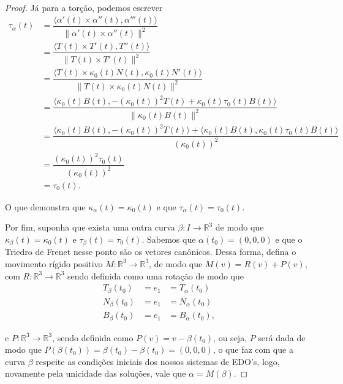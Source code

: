 \documentclass[11pt,letterpaper,twocolumn]{article}
\begin{document}
\begin{proof}
    Já para a torção, podemos escrever 
    \begin{equation*}
        \begin{split}
            \tau_\alpha(t) & = \dfrac{\langle \alpha'(t)\times \alpha''(t), \alpha'''(t)\rangle}{\|\alpha'(t)\times \alpha''(t)\|^2} \\
            & = \dfrac{\langle T(t)\times T'(t), T''(t)\rangle}{\|T(t)\times T'(t)\|^2} \\
            & = \dfrac{\langle T(t)\times \kappa_0(t)N(t), \kappa_0(t)N'(t)\rangle}{\|T(t)\times \kappa_0(t)N(t)\|^2} \\
            & = \dfrac{\langle \kappa_0(t)B(t), -(\kappa_0(t))^2T(t) + \kappa_0(t)\tau_0(t)B(t)\rangle}{\|\kappa_0(t)B(t)\|^2} \\
            & = \dfrac{\langle \kappa_0(t)B(t), -\left(\kappa_0(t)\right)^2T(t)\rangle + \langle \kappa_0(t)B(t), \kappa_0(t)\tau_0(t)B(t)\rangle}{\left(\kappa_0(t)\right)^2} \\
            & = \dfrac{\left(\kappa_0(t)\right)^2\tau_0(t)}{\left(\kappa_0(t)\right)^2} \\
            & = \tau_0(t).
        \end{split}
    \end{equation*}
    
    O que demonstra que $\kappa_\alpha(t) = \kappa_0(t)$ e que $\tau_\alpha(t) = \tau_0(t)$.
    
    Por fim, suponha que exista uma outra curva $\beta : I\to \mathbb{R}^3$ de modo que $\kappa_\beta(t) = \kappa_0(t)$ e $\tau_\beta(t) = \tau_0(t)$. Sabemos que $\alpha(t_0) = (0, 0, 0)$ e que o Triedro de Frenet nesse ponto são os vetores canônicos. Dessa forma, defina o movimento rígido positivo $M : \mathbb{R}^3\to \mathbb{R}^3$, de modo que $M(v) = R(v) + P(v)$, com $R : \mathbb{R}^3\to \mathbb{R}^3$ sendo definida como uma rotação de modo que
    \begin{equation*}
        \begin{split}
            T_\beta(t_0) & = e_1 & = T_\alpha(t_0) \\
            N_\beta(t_0) & = e_1 & = N_\alpha(t_0) \\
            B_\beta(t_0) & = e_1 & = B_\alpha(t_0),
        \end{split}
    \end{equation*}
    
    \noindent e $P : \mathbb{R}^3\to \mathbb{R}^3$, sendo definida como $P(v) = v - \beta(t_0)$, ou seja, $P$ será dada de modo que $P(\beta(t_0)) = \beta(t_0) - \beta(t_0) = (0, 0, 0)$, o que faz com que a curva $\beta$ respeite as condições iniciais dos nossos sistemas de EDO's, logo, novamente pela unicidade das soluções, vale que $\alpha = M(\beta)$.
\end{proof}
\end{document}
